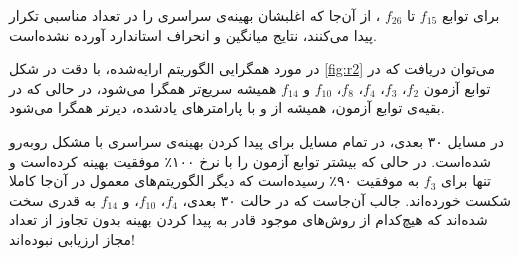 \documentclass[12pt,a4paper]{article}
\theoremstyle{definition}
\theoremstyle{theorem}
\theoremstyle{definition}
\begin{document}
\begin{figure}
\noindent{}
\end{figure}
برای توابع 
$f_{15}$
تا 
$f_{26}$
، از آن‌جا که اغلبشان بهینه‌ی سراسری را در تعداد مناسبی تکرار پیدا می‌کنند، نتایج میانگین و انحراف استاندارد آورده نشده‌است. 

در مورد همگرایی الگوریتم ارایه‌شده، با دقت در شکل \ref{fig:r2} می‌توان دریافت که در توابع آزمون 
$f_2$، 
$f_3$، 
$f_4$، 
$f_8$، 
$f_{10}$ و
$f_{14}$
همیشه سریع‌تر همگرا می‌شود، در حالی که در بقیه‌ی توابع آزمون، همیشه از 
و 
با پارامترهای یادشده، دیرتر همگرا می‌شود.


در مسایل ۳۰ بعدی، 
در تمام مسایل برای پیدا کردن بهینه‌ی سراسری با مشکل روبه‌رو شده‌است. در حالی که  بیشتر توابع آزمون را با نرخ ۱۰۰٪ موفقیت بهینه کرده‌است و تنها برای 
$f_3$ 
به موفقیت ۹۰٪ رسیده‌است که دیگر الگوریتم‌های معمول در آن‌جا کاملا شکست خورده‌اند. جالب آن‌جاست که در حالت ۳۰ بعدی، 
$f_4$،
$f_{10}$، 
و 
$f_{14}$
به قدری سخت شده‌اند که هیچ‌کدام از روش‌های موجود قادر به پیدا کردن بهینه بدون تجاوز از تعداد مجاز ارزیابی نبوده‌اند!
\end{document}

